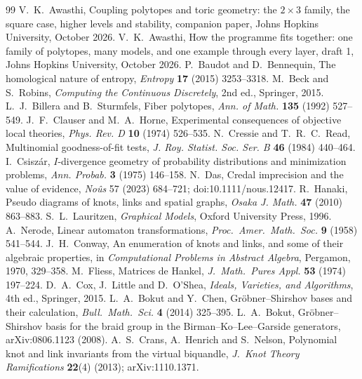 \documentclass[11pt]{article}
\theoremstyle{definition}\newtheorem{definition}[theorem]{Definition}\newtheorem{remark}[theorem]{Remark}\newtheorem{example}[theorem]{Example}\newtheorem{problem}[theorem]{Open problem}\crefname{problem}{Problem}{Problems}
\begin{document}
\begin{thebibliography}{99}
 V.~K.~Awasthi, Coupling polytopes and toric geometry: the $2\times3$ family, the square case, higher levels and stability, companion paper, Johns Hopkins University, October 2026.
 V.~K.~Awasthi, How the programme fits together: one family of polytopes, many models, and one example through every layer, draft 1, Johns Hopkins University, October 2026.
 P.~Baudot and D.~Bennequin, The homological nature of entropy, \emph{Entropy} \textbf{17} (2015) 3253--3318.
 M.~Beck and S.~Robins, \emph{Computing the Continuous Discretely}, 2nd ed., Springer, 2015.
 L.~J.~Billera and B.~Sturmfels, Fiber polytopes, \emph{Ann. of Math.} \textbf{135} (1992) 527--549.
 J.~F.~Clauser and M.~A.~Horne, Experimental consequences of objective local theories, \emph{Phys. Rev. D} \textbf{10} (1974) 526--535.
 N.~Cressie and T.~R.~C.~Read, Multinomial goodness-of-fit tests, \emph{J. Roy. Statist. Soc. Ser. B} \textbf{46} (1984) 440--464.
 I.~Csisz\'ar, $I$-divergence geometry of probability distributions and minimization problems, \emph{Ann. Probab.} \textbf{3} (1975) 146--158.
 N.~Das, Credal imprecision and the value of evidence, \emph{No\^us} 57 (2023) 684--721; doi:10.1111/nous.12417.
 R.~Hanaki, Pseudo diagrams of knots, links and spatial graphs, \emph{Osaka J. Math.} \textbf{47} (2010) 863--883.
 S.~L.~Lauritzen, \emph{Graphical Models}, Oxford University Press, 1996.
 A.~Nerode, Linear automaton transformations, \emph{Proc.\ Amer.\ Math.\ Soc.} \textbf{9} (1958) 541--544.
 J.~H.~Conway, An enumeration of knots and links, and some of their algebraic properties, in \emph{Computational Problems in Abstract Algebra}, Pergamon, 1970, 329--358.
 M.~Fliess, Matrices de Hankel, \emph{J.\ Math.\ Pures Appl.} \textbf{53} (1974) 197--224.
 D.~A.~Cox, J.~Little and D.~O'Shea, \emph{Ideals, Varieties, and Algorithms}, 4th ed., Springer, 2015.
 L.~A.~Bokut and Y.~Chen, Gr\"obner--Shirshov bases and their calculation, \emph{Bull.\ Math.\ Sci.} \textbf{4} (2014) 325--395.
 L.~A.~Bokut, Gr\"obner--Shirshov basis for the braid group in the Birman--Ko--Lee--Garside generators, arXiv:0806.1123 (2008).
 A.~S.~Crans, A.~Henrich and S.~Nelson, Polynomial knot and link invariants from the virtual biquandle, \emph{J.\ Knot Theory Ramifications} \textbf{22}(4) (2013); arXiv:1110.1371.

\end{thebibliography}
\end{document}
